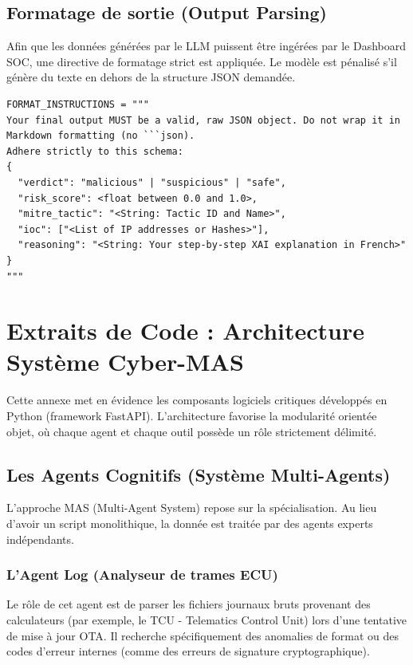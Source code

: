 \documentclass[a4paper, 12pt]{report}
\begin{document}
\section{Formatage de sortie (Output Parsing)}
Afin que les données générées par le LLM puissent être ingérées par le Dashboard SOC, une directive de formatage strict est appliquée. Le modèle est pénalisé s'il génère du texte en dehors de la structure JSON demandée.

\vspace{0.3cm}
\noindent\begin{minipage}{\linewidth}
\begin{lstlisting}[basicstyle=\footnotesize\ttfamily\color{codeid}, breaklines=true, caption={Contrainte syntaxique pour la génération de JSON pur.}]
FORMAT_INSTRUCTIONS = """
Your final output MUST be a valid, raw JSON object. Do not wrap it in Markdown formatting (no ```json).
Adhere strictly to this schema:
{
  "verdict": "malicious" | "suspicious" | "safe",
  "risk_score": <float between 0.0 and 1.0>,
  "mitre_tactic": "<String: Tactic ID and Name>",
  "ioc": ["<List of IP addresses or Hashes>"],
  "reasoning": "<String: Your step-by-step XAI explanation in French>"
}
"""
\end{lstlisting}
\end{minipage}


\chapter{Extraits de Code : Architecture Système Cyber-MAS}
\label{annexe:architecture_code}

Cette annexe met en évidence les composants logiciels critiques développés en Python (framework FastAPI). L'architecture favorise la modularité orientée objet, où chaque agent et chaque outil possède un rôle strictement délimité.

\section{Les Agents Cognitifs (Système Multi-Agents)}

L'approche MAS (Multi-Agent System) repose sur la spécialisation. Au lieu d'avoir un script monolithique, la donnée est traitée par des agents experts indépendants.

\subsection{L'Agent Log (Analyseur de trames ECU)}
Le rôle de cet agent est de parser les fichiers journaux bruts provenant des calculateurs (par exemple, le TCU - Telematics Control Unit) lors d'une tentative de mise à jour OTA. Il recherche spécifiquement des anomalies de format ou des codes d'erreur internes (comme des erreurs de signature cryptographique).
\end{document}
